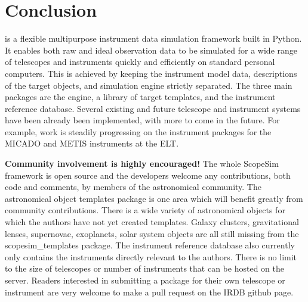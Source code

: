 \section{Conclusion}
\label{conclusion}

\ScopeSim{} is a flexible multipurpose instrument data simulation framework built in Python.
It enables both raw and ideal observation data to be simulated for a wide range of telescopes and instruments quickly and efficiently on standard personal computers.
This is achieved by keeping the instrument model data, descriptions of the target objects, and simulation engine strictly separated.
The three main packages are the \ScopeSim{} engine, a library of target templates, and the instrument reference database.
Several existing and future telescope and instrument systems have been already been implemented, with more to come in the future.
For example, work is steadily progressing on the instrument packages for the MICADO and METIS instruments at the ELT.

\textbf{Community involvement is highly encouraged!}
The whole ScopeSim framework is open source and the developers welcome any contributions, both code and comments, by members of the astronomical community.
The astronomical object templates package is one area which will benefit greatly from community contributions.
There is a wide variety of astronomical objects for which the authors have not yet created templates.
Galaxy clusters, gravitational lenses, supernovae, exoplanets, solar system objects are all still missing from the scopesim\_templates package.
The instrument reference database also currently only contains the instruments directly relevant to the authors.
There is no limit to the size of telescopes or number of instruments that can be hosted on the server.
Readers interested in submitting a package for their own telescope or instrument are very welcome to make a pull request on the IRDB github page.
